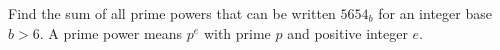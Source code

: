 Find the sum of all prime powers that can be written $5654_b$ for an integer base $b>6$. A prime power means $p^e$ with prime $p$ and positive integer $e$.
